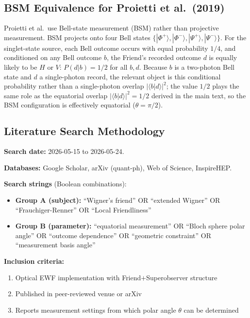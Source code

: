 \documentclass[12pt]{article}
\begin{document}
\subsection{BSM Equivalence for Proietti et al.\ (2019)}

Proietti et al.\ use Bell-state measurement (BSM) rather than projective measurement. BSM projects onto four Bell states $\{|\Phi^+\rangle, |\Phi^-\rangle, |\Psi^+\rangle, |\Psi^-\rangle\}$. For the singlet-state source, each Bell outcome occurs with equal probability $1/4$, and conditioned on any Bell outcome $b$, the Friend's recorded outcome $d$ is equally likely to be $H$ or $V$: $P(d|b) = 1/2$ for all $b,d$. Because $b$ is a two-photon Bell state and $d$ a single-photon record, the relevant object is this conditional probability rather than a single-photon overlap $|\langle b|d\rangle|^2$; the value $1/2$ plays the same role as the equatorial overlap $|\langle b|d\rangle|^2 = 1/2$ derived in the main text, so the BSM configuration is effectively equatorial ($\theta = \pi/2$).

\subsection{Literature Search Methodology}

\textbf{Search date:} 2026-05-15 to 2026-05-24.

\textbf{Databases:} Google Scholar, arXiv (quant-ph), Web of Science, InspireHEP.

\textbf{Search strings} (Boolean combinations):
\begin{itemize}
\item \textbf{Group A (subject):} ``Wigner's friend'' OR ``extended Wigner'' OR ``Frauchiger-Renner'' OR ``Local Friendliness''
\item \textbf{Group B (parameter):} ``equatorial measurement'' OR ``Bloch sphere polar angle'' OR ``outcome dependence'' OR ``geometric constraint'' OR ``measurement basis angle''
\end{itemize}

\textbf{Inclusion criteria:}
\begin{enumerate}
\item Optical EWF implementation with Friend$+$Superobserver structure
\item Published in peer-reviewed venue or arXiv
\item Reports measurement settings from which polar angle $\theta$ can be determined
\end{enumerate}
\end{document}
